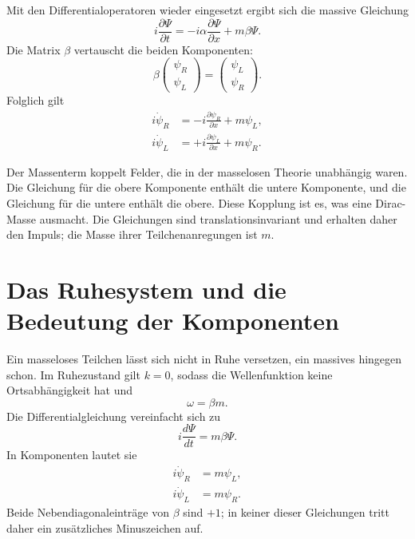 Mit den Differentialoperatoren wieder eingesetzt ergibt sich die massive Gleichung
\begin{equation}
i\frac{\partial\Psi}{\partial t}
=
-i\alpha\frac{\partial\Psi}{\partial x}
+m\beta\Psi.
\end{equation}
Die Matrix \(\beta\) vertauscht die beiden Komponenten:
\begin{equation}
\beta
\begin{pmatrix}
\psi_R\\
\psi_L
\end{pmatrix}
=
\begin{pmatrix}
\psi_L\\
\psi_R
\end{pmatrix}.
\end{equation}
Folglich gilt
\begin{align}
i\dot{\psi}_R
&=-i\frac{\partial\psi_R}{\partial x}+m\psi_L,\\
i\dot{\psi}_L
&=+i\frac{\partial\psi_L}{\partial x}+m\psi_R.
\end{align}

Der Massenterm koppelt Felder, die in der masselosen Theorie unabhängig waren. Die Gleichung für die obere Komponente enthält die untere Komponente, und die Gleichung für die untere enthält die obere. Diese Kopplung ist es, was eine Dirac-Masse ausmacht. Die Gleichungen sind translationsinvariant und erhalten daher den Impuls; die Masse ihrer Teilchenanregungen ist \(m\).

\begin{classroomqa}
\end{classroomqa}

\section{Das Ruhesystem und die Bedeutung der Komponenten}

Ein masseloses Teilchen lässt sich nicht in Ruhe versetzen, ein massives hingegen schon. Im Ruhezustand gilt \(k=0\), sodass die Wellenfunktion keine Ortsabhängigkeit hat und
\begin{equation}
\omega=\beta m.
\end{equation}
Die Differentialgleichung vereinfacht sich zu
\begin{equation}
i\frac{d\Psi}{dt}=m\beta\Psi.
\end{equation}
In Komponenten lautet sie
\begin{align}
i\dot{\psi}_R&=m\psi_L,\\
i\dot{\psi}_L&=m\psi_R.
\end{align}
Beide Nebendiagonaleinträge von \(\beta\) sind \(+1\); in keiner dieser Gleichungen tritt daher ein zusätzliches Minuszeichen auf.

